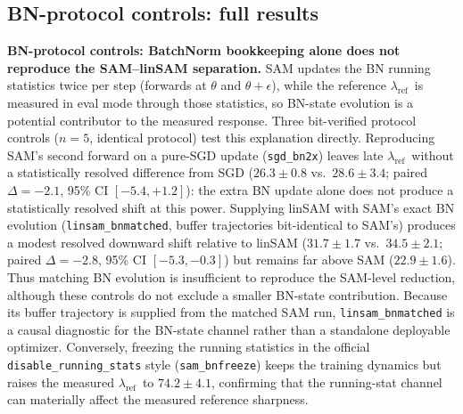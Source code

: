 \documentclass{article}
\theoremstyle{plain}
\theoremstyle{definition}
\theoremstyle{remark}
\newcommand{\lref}{\ensuremath{\lambda_{\mathrm{ref}}}}
\begin{document}
\subsection{BN-protocol controls: full results}\label{sub:bnproto}
\textbf{BN-protocol controls: BatchNorm bookkeeping alone does not reproduce
the SAM--linSAM separation.} SAM updates the BN running statistics twice per
step (forwards at $\theta$ and $\theta{+}\epsilon$), while the reference
\lref\ is measured in eval mode through those statistics, so BN-state
evolution is a potential contributor to the measured response. Three
bit-verified protocol controls ($n{=}5$, identical protocol) test this
explanation directly. Reproducing SAM's second forward on a pure-SGD update
(\texttt{sgd\_bn2x}) leaves late \lref\ without a statistically resolved
difference from SGD ($26.3{\pm}0.8$ vs.\ $28.6{\pm}3.4$; paired
$\Delta{=}{-}2.1$, 95\% CI $[{-}5.4,{+}1.2]$): the extra BN update alone
does not produce a statistically resolved shift at this power. Supplying
linSAM with SAM's exact BN evolution (\texttt{linsam\_bnmatched}, buffer
trajectories bit-identical to SAM's) produces a modest resolved downward
shift relative to linSAM ($31.7{\pm}1.7$ vs.\ $34.5{\pm}2.1$; paired
$\Delta{=}{-}2.8$, 95\% CI $[{-}5.3,{-}0.3]$) but remains far above SAM
($22.9{\pm}1.6$). Thus matching BN evolution is insufficient to reproduce
the SAM-level reduction, although these controls do not exclude a smaller
BN-state contribution. Because its buffer trajectory is supplied from
the matched SAM run, \texttt{linsam\_bnmatched} is a causal
diagnostic for the BN-state channel rather than a standalone
deployable optimizer. Conversely, freezing the running statistics in the
official \texttt{disable\_running\_stats} style (\texttt{sam\_bnfreeze})
keeps the training dynamics but raises the measured \lref\ to
$74.2{\pm}4.1$, confirming that the running-stat channel can materially
affect the measured reference sharpness.
\end{document}
